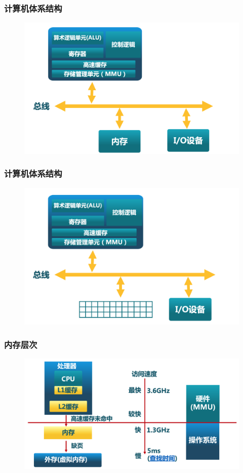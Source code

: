 \begin{frame}[plain,t]
    
    \frametitle{计算机体系结构}
    \begin{figure}
        \centering
        \includegraphics[width=0.7\linewidth]{arch2}
    \end{figure}
    
\end{frame}
\begin{frame}[plain,t]
    
    \frametitle{计算机体系结构}
    \begin{figure}
        \centering
        \includegraphics[width=0.7\linewidth]{arch3}
    \end{figure}
    
\end{frame}
\begin{frame}[plain,t]
    
    \frametitle{内存层次}
    \begin{figure}
        \centering
        \includegraphics[width=0.7\linewidth]{hierarchy}
    \end{figure}
    
\end{frame}
